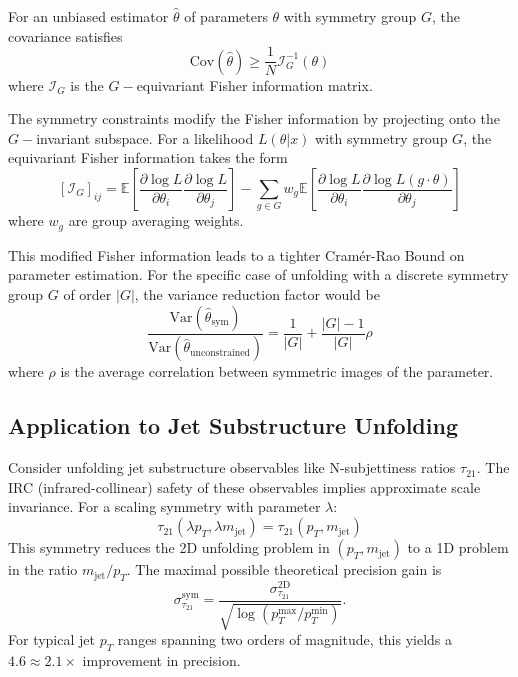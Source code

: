             For an unbiased estimator \(\hat{\theta}\) of parameters \(\theta\) with symmetry group \(G\), the covariance satisfies
            \[
                \text{Cov}(\hat{\theta}) \geq \frac{1}{N} \mathcal{I}^{-1}_G(\theta)
            \]
            where \(\mathcal{I}_G\) is the \(G-\)equivariant Fisher information matrix.

            The symmetry constraints modify the Fisher information by projecting onto the \(G-\)invariant subspace.
            For a likelihood \(L(\theta|x)\) with symmetry group \(G\), the equivariant Fisher information takes the form
            \[
                [\mathcal{I}_G]_{ij} = \mathbb{E}\left[\frac{\partial \log L}{\partial \theta_i} \frac{\partial \log L}{\partial \theta_j}\right] - \sum_{g \in G} w_g \mathbb{E}\left[\frac{\partial \log L}{\partial \theta_i} \frac{\partial \log L(g \cdot \theta)}{\partial \theta_j}\right]
            \]
            where \(w_g\) are group averaging weights.
            
            This modified Fisher information leads to a tighter Cram\'er-Rao Bound on parameter estimation.
            For the specific case of unfolding with a discrete symmetry group \(G\) of order \(|G|\), the variance reduction factor would be
            \[
                \frac{\text{Var}(\hat{\theta}_\text{sym})}{\text{Var}(\hat{\theta}_\text{unconstrained})} = \frac{1}{|G|} + \frac{|G|-1}{|G|}\rho
            \]
            where \(\rho\) is the average correlation between symmetric images of the parameter.

    \subsection{Application to Jet Substructure Unfolding}
        Consider unfolding jet substructure observables like N-subjettiness ratios \(\tau_{21}\).
        The IRC (infrared-collinear) safety of these observables implies approximate scale invariance.
        For a scaling symmetry with parameter \(\lambda\):
        \[
            \tau_{21}(\lambda p_T, \lambda m_\text{jet}) = \tau_{21}(p_T, m_\text{jet})
        \]
        This symmetry reduces the 2D unfolding problem in \((p_T, m_\text{jet})\) to a 1D problem in the ratio \(m_\text{jet}/p_T\).
        The maximal possible theoretical precision gain is
        \[
            \sigma_{\tau_{21}}^\text{sym} = \frac{\sigma_{\tau_{21}}^\text{2D}}{\sqrt{\log(p_T^\text{max}/p_T^\text{min})}}.
        \]
        For typical jet \(p_T\) ranges spanning two orders of magnitude, this yields a \(4.6 \approx 2.1\times\) improvement in precision.

